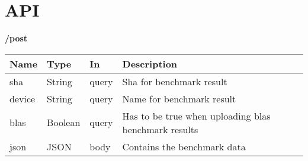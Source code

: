 \section{API}

\textbf{/post}
\begin{tabular}{ l l l l }
Name & Type & In & Description \\ 
\hline
sha & String & query & Sha for benchmark result \\
device & String & query & Name for benchmark result \\
blas & Boolean & query & Has to be true when uploading blas benchmark results \\
json & JSON & body & Contains the benchmark data \\
\hline
\end{tabular}


